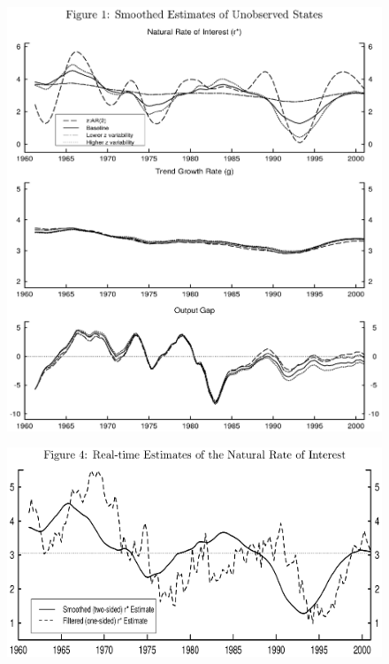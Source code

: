 \documentclass{beamer}
\begin{document}
\begin{frame}
  \begin{figure}
    \includegraphics[scale=.5]{lw.eps}
  \end{figure}
\end{frame}

\begin{frame}
  \begin{figure}
    \includegraphics[scale=.7]{lw2.eps}
  \end{figure}
\end{frame}



\end{document}

